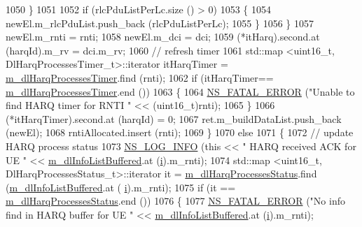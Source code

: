 \begin{DoxyCode}
1050                 \}
1051 
1052               \textcolor{keywordflow}{if} (rlcPduListPerLc.size () > 0)
1053                 \{
1054                   newEl.m\_rlcPduList.push\_back (rlcPduListPerLc);
1055                 \}
1056             \}
1057           newEl.m\_rnti = rnti;
1058           newEl.m\_dci = dci;
1059           (*itHarq).second.at (harqId).m\_rv = dci.m\_rv;
1060           \textcolor{comment}{// refresh timer}
1061           std::map <uint16\_t, DlHarqProcessesTimer\_t>::iterator itHarqTimer = 
      \hyperlink{classns3_1_1PssFfMacScheduler_afcae17e3f08b0a6f1e1458a39da8cdcb}{m\_dlHarqProcessesTimer}.find (rnti);
1062           \textcolor{keywordflow}{if} (itHarqTimer== \hyperlink{classns3_1_1PssFfMacScheduler_afcae17e3f08b0a6f1e1458a39da8cdcb}{m\_dlHarqProcessesTimer}.end ())
1063             \{
1064               \hyperlink{group__fatal_ga5131d5e3f75d7d4cbfd706ac456fdc85}{NS\_FATAL\_ERROR} (\textcolor{stringliteral}{"Unable to find HARQ timer for RNTI "} << (uint16\_t)rnti);
1065             \}
1066           (*itHarqTimer).second.at (harqId) = 0;
1067           ret.m\_buildDataList.push\_back (newEl);
1068           rntiAllocated.insert (rnti);
1069         \}
1070       \textcolor{keywordflow}{else}
1071         \{
1072           \textcolor{comment}{// update HARQ process status}
1073           \hyperlink{group__logging_gafbd73ee2cf9f26b319f49086d8e860fb}{NS\_LOG\_INFO} (\textcolor{keyword}{this} << \textcolor{stringliteral}{" HARQ received ACK for UE "} << 
      \hyperlink{classns3_1_1PssFfMacScheduler_a3a7d9c7460c66767201d15a1d6f58758}{m\_dlInfoListBuffered}.at (\hyperlink{bernuolliDistribution_8m_a6f6ccfcf58b31cb6412107d9d5281426}{i}).m\_rnti);
1074           std::map <uint16\_t, DlHarqProcessesStatus\_t>::iterator it = 
      \hyperlink{classns3_1_1PssFfMacScheduler_aaddeb3fa864cb82b5829d4ca1cf9abea}{m\_dlHarqProcessesStatus}.find (\hyperlink{classns3_1_1PssFfMacScheduler_a3a7d9c7460c66767201d15a1d6f58758}{m\_dlInfoListBuffered}.at (
      \hyperlink{bernuolliDistribution_8m_a6f6ccfcf58b31cb6412107d9d5281426}{i}).m\_rnti);
1075           \textcolor{keywordflow}{if} (it == \hyperlink{classns3_1_1PssFfMacScheduler_aaddeb3fa864cb82b5829d4ca1cf9abea}{m\_dlHarqProcessesStatus}.end ())
1076             \{
1077               \hyperlink{group__fatal_ga5131d5e3f75d7d4cbfd706ac456fdc85}{NS\_FATAL\_ERROR} (\textcolor{stringliteral}{"No info find in HARQ buffer for UE "} << 
      \hyperlink{classns3_1_1PssFfMacScheduler_a3a7d9c7460c66767201d15a1d6f58758}{m\_dlInfoListBuffered}.at (\hyperlink{bernuolliDistribution_8m_a6f6ccfcf58b31cb6412107d9d5281426}{i}).m\_rnti);

\end{DoxyCode}
